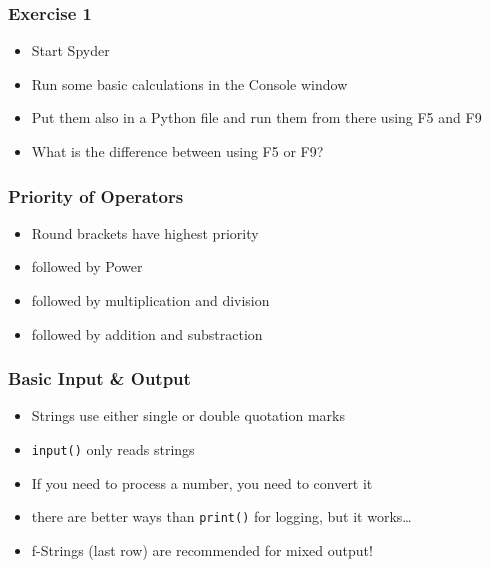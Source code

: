 \documentclass[ngerman]{beamer}
\begin{document}
\begin{frame}
\frametitle{Exercise 1}


\begin{itemize}
\item Start Spyder
\item Run some basic calculations in the Console window
\item Put them also in a Python file and run them from there using F5 and F9
\item What is the difference between using F5 or F9?
\end{itemize}
\end{frame}



\begin{frame}
\frametitle{Priority of Operators}

\begin{itemize}
\item Round brackets have highest priority
\item followed by Power
\item followed by multiplication and division
\item followed by addition and substraction
\end{itemize}


\end{frame}

\begin{frame}[fragile]
\frametitle{Basic Input \& Output}



\begin{itemize}
	\item Strings use either single or double quotation marks
	\item \lstinline[style=Python]{input()} only reads strings	
	\item If you need to process a number, you need to convert it 
	\item there are better ways than \lstinline[style=Python]{print()} for logging, but it works\ldots 
	\item f-Strings (last row) are recommended for mixed output!
	\end{itemize}
\end{frame}
\end{document}
